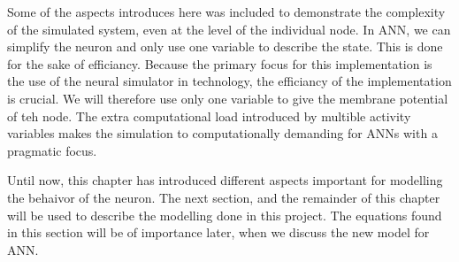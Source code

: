 Some of the aspects introduces here was included to demonstrate the complexity of the simulated system, even at the level of the individual node.
In ANN, we can simplify the neuron and only use one variable to describe the state. 
This is done for the sake of efficiancy.
Because the primary focus for this implementation is the use of the neural simulator in technology, the efficiancy of the implementation is crucial. 
We will therefore use only one variable to give the membrane potential of teh node.
The extra computational load introduced by multible activity variables makes the simulation to computationally demanding for ANNs with a pragmatic focus. 






Until now, this chapter has introduced different aspects important for modelling the behaivor of the neuron.
The next section, and the remainder of this chapter will be used to describe the modelling done in this project.
The equations found in this section will be of importance later, when we discuss the new model for ANN.


%


